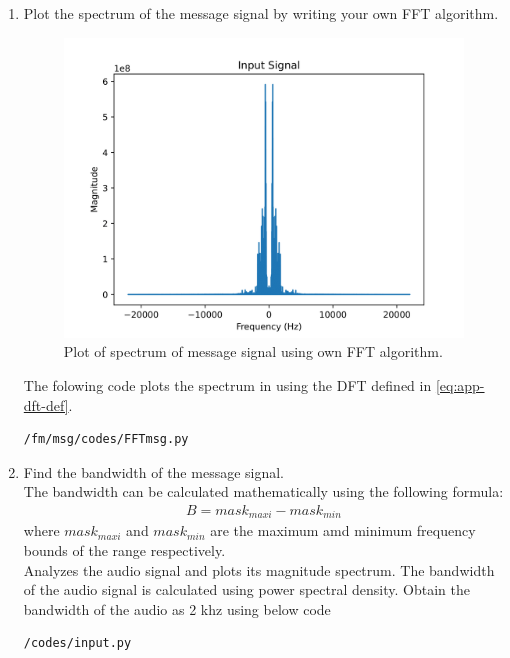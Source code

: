 \begin{enumerate}[label=\arabic*.,ref=\thesection.\theenumi]
\item Plot the spectrum of the message signal by writing your own FFT algorithm.\\
	\solution
\begin{figure}[H]
\centering
\includegraphics[width=\columnwidth]{fm/msg/figs/FFTown/input2.png}
\caption{Plot of spectrum of message signal using own FFT algorithm.}
\label{fig:FFTo}
\end{figure}
The folowing code plots the spectrum in  using the DFT defined in  \eqref{eq:app-dft-def}.
\begin{lstlisting}
/fm/msg/codes/FFTmsg.py
\end{lstlisting}

\item Find the bandwidth of the message signal.\\
\solution The bandwidth can be calculated mathematically using the following formula:
\begin{align*}
B=mask_{maxi}-mask_{min}
\end{align*}
where $mask_{maxi}$ and $mask_{min} $ are the maximum amd minimum frequency bounds of the range  respectively.\\
Analyzes the audio signal and plots its magnitude spectrum. The bandwidth of the audio signal is  calculated using power spectral density. Obtain the bandwidth of the audio as 2 khz using below code
\begin{lstlisting}
/codes/input.py
\end{lstlisting}
\end{enumerate}
